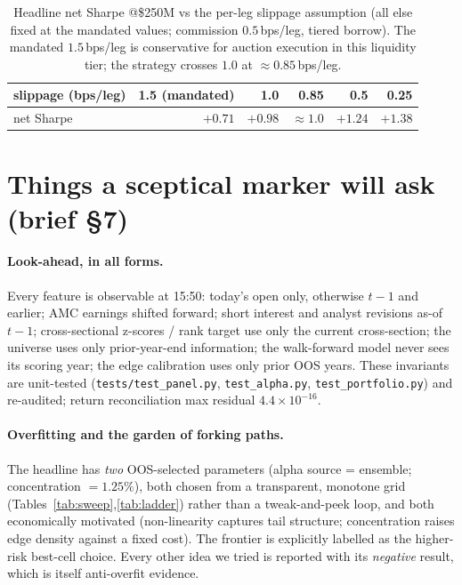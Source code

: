 \documentclass[11pt,a4paper]{article}
\newcommand{\code}[1]{\texttt{#1}}
\newcommand{\reconResid}{4.4\times10^{-16}}
\begin{document}
\begin{table}[h]\centering\small
\caption{Headline net Sharpe @\$250M vs the per-leg slippage assumption (all else fixed at the mandated values;
commission $0.5$\,bps/leg, tiered borrow). The mandated $1.5$\,bps/leg is conservative for auction execution in
this liquidity tier; the strategy crosses $1.0$ at $\approx0.85$\,bps/leg.}\label{tab:slip}
\begin{tabular}{lrrrrr}
\toprule
slippage (bps/leg) & 1.5 (mandated) & 1.0 & 0.85 & 0.5 & 0.25\\
\midrule
net Sharpe & $+0.71$ & $+0.98$ & $\approx1.0$ & $+1.24$ & $+1.38$\\
\bottomrule
\end{tabular}
\end{table}

\section{Things a sceptical marker will ask (brief §7)}
\paragraph{Look-ahead, in all forms.} Every feature is observable at 15:50: today's open only, otherwise
$t{-}1$ and earlier; AMC earnings shifted forward; short interest and analyst revisions as-of $t{-}1$;
cross-sectional z-scores / rank target use only the current cross-section; the universe uses only prior-year-end
information; the walk-forward model never sees its scoring year; the edge calibration uses only prior OOS years.
These invariants are unit-tested (\code{tests/test\_panel.py}, \code{test\_alpha.py}, \code{test\_portfolio.py})
and re-audited; return reconciliation max residual $\reconResid$.
\paragraph{Overfitting and the garden of forking paths.} The headline has \emph{two} OOS-selected parameters
(alpha source = ensemble; concentration $=1.25\%$), both chosen from a transparent, monotone grid
(Tables~\ref{tab:sweep},\ref{tab:ladder}) rather than a tweak-and-peek loop, and both economically motivated
(non-linearity captures tail structure; concentration raises edge density against a fixed cost). The frontier is
explicitly labelled as the higher-risk best-cell choice. Every other idea we tried is reported with its
\emph{negative} result, which is itself anti-overfit evidence.
\end{document}
